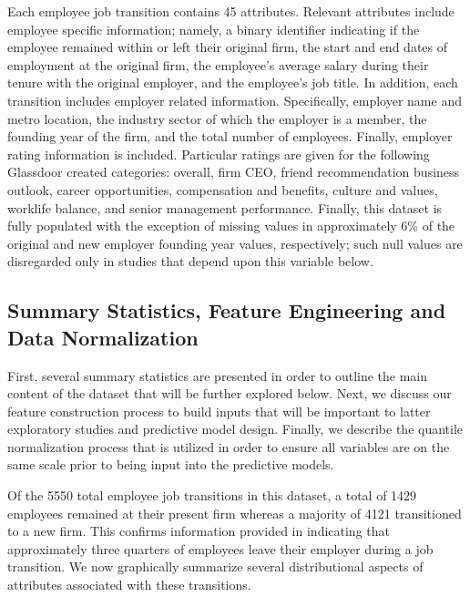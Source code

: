 \documentclass[10pt]{article}
\begin{document}
Each employee job transition contains 45 attributes.  Relevant attributes 
include employee specific information; namely, a binary identifier 
indicating if the employee remained within or left their original firm,
the start and end dates of employment at the original firm, the 
employee's average salary during their tenure with the original employer, 
and the employee's job title. 
In addition, each transition includes employer related information. 
Specifically, employer name and metro location, the industry sector of which the employer 
is a member, the founding year of the firm, and the total number of employees. 
Finally, employer rating information is included.  Particular ratings are 
given for the following Glassdoor created categories: overall, firm CEO, friend recommendation 
business outlook, career opportunities, compensation and benefits, culture and values, 
worklife balance, and senior management performance. 
Finally, this dataset is fully populated with the exception of missing values in 
approximately 6\% of the original and new employer founding year values, respectively;
such null values are disregarded 
only in studies that depend upon this variable below.

\subsection{Summary Statistics, Feature Engineering and Data Normalization}

\hspace{\parindent} First, several summary statistics are presented in order to outline 
the main content of the dataset that will be further explored below.
Next, we discuss our feature construction process to build inputs 
that will be important to latter exploratory studies and predictive 
model design.  Finally, we describe the quantile normalization process 
that is utilized in order to ensure all variables are on the same scale prior 
to being input into the predictive models.

Of the 5550 total employee job transitions in this dataset, 
a total of 1429 employees remained at their present firm whereas a majority of 4121 
transitioned to a new firm.  This confirms information provided in \cite{Smart2016} indicating 
that approximately three quarters of employees leave their employer during a job 
transition.  We now graphically summarize several distributional aspects of 
attributes associated with these transitions.
\end{document}

